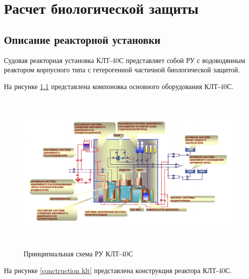 \chapter{Расчет биологической защиты}
\section{Описание реакторной установки}
Судовая реакторная установка КЛТ-40С представляет собой РУ с водоводянным реактором корпусного типа с гетерогенной частичной биологической защитой. 

На рисунке \ref{principle} представлена компоновка основного оборудования  КЛТ-40С.
\begin{figure}[!h]
	\center
	\includegraphics[height=8cm]{media/safe_2.png}
	\caption{Принципиальная схема РУ КЛТ-40С\cite{belyev}}
	\label{principle}
\end{figure}

На рисунке \ref{conctruction klt} представлена конструкция реактора КЛТ-40С.

